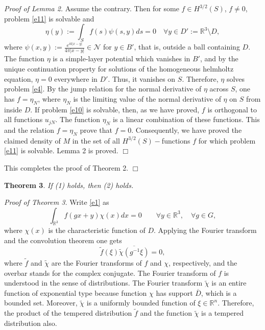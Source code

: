 \documentclass[12pt,leqno]{article}
\def\R{\mathbb{R}}
\begin{document}
{\it Proof of  Lemma 2.}
Assume the contrary. Then for some $f\in H^{3/2}(S)$, $f\neq 0$,  problem
\eqref{e11} is solvable and
$$\eta(y):=\int_S f(s)\psi(s,y)ds=0\quad \forall y\in D':=\R^3\setminus
D,$$
where $\psi(x,y):=\frac{e^{ik|x-y|}}{4\pi |x-y|}\in \mathcal{N}$ for $y\in
B'$, that is, outside a ball containing $D$.  The function  $\eta$ is a
simple-layer potential which vanishes in $B'$, and by the unique
continuation property for solutions of the homogeneous helmholtz
equation, $\eta=0$ everywhere in $D'$. Thus, it vanishes on $S$.
Therefore, $\eta$ solves
problem \eqref{e4}. By the jump relation for the normal derivative of
$\eta$ across $S$, one has $f=\eta_{N}$, where $\eta_{N}$ is the limiting
value of the normal derivative of $\eta$ on $S$ from inside $D$. If
problem \eqref{e10} is solvable, then, as we have proved,
$f$ is orthogonal to all functions $u_{jN}$. The function $\eta_{N}$
is a linear combination of these functions. This and the relation
$f=\eta_{N}$ prove that $f=0$.
Consequently, we have proved the claimed density of $M$ in the set
of all $H^{3/2}(S)-$functions $f$ for which problem \eqref{e11} is
solvable.  Lemma 2 is proved. \hfill $\Box$

This completes the proof of Theorem 2. \hfill $\Box$



{\bf Theorem 3}. {\it If (1) holds, then (2) holds.}

{\it Proof of Theorem 3.} Write \eqref{e1} as
$$\int_{\R^3}f(gx+y)\chi (x)dx=0\qquad \forall y\in \R^3,\quad \forall
g\in G,$$ where $\chi (x)$ is the characteristic function of $D$.
Applying the Fourier transform and the convolution theorem one gets
\begin{equation}
\label{eX}
\tilde{f}(\xi)\overline{\tilde{\chi}(g^{-1}\xi)}=0,
\end{equation}
 where
$\tilde{f}$ and $\tilde{\chi}$ are the Fourier transforms of $f$ and
$\chi$, respectively, and the overbar stands for the complex
conjugate. The Fourier transform of $f$ is understood in the sense
of distributions. The Fourier transform $\tilde{\chi}$ is an entire
function of exponential type because function $\chi$ has support
$\overline{D}$, which is a bounded set. Moreover, $\tilde{\chi}$ is
a uniformly bounded function of $\xi\in \R^n$. Therefore, the
product of the tempered distribution $\tilde{f}$ and the function
$\tilde{\chi}$ is a tempered distribution also.
\end{document}
